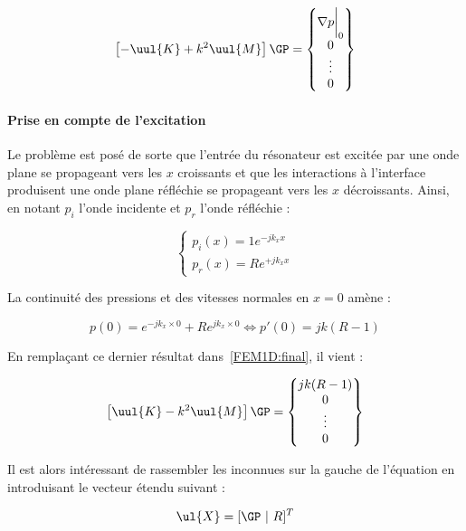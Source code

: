 \begin{equation}
	\left[- \uul{K} + k^2\uul{M}\right]\GP = \begin{Bmatrix} \nabla p\bigg|_0\\0\\\vdots\\0\end{Bmatrix}
\end{equation}

\paragraph{Prise en compte de l'excitation}

Le problème est posé de sorte que l'entrée du résonateur est excitée par une onde plane se propageant vers les $x$
croissants et que les interactions à l'interface produisent une onde plane réfléchie se propageant vers les $x$
décroissants. Ainsi, en notant $p_i$ l'onde incidente et $p_r$ l'onde réfléchie :

\begin{equation}
	\left\{
	\begin{array}{l}
		p_i(x) = 1e^{-jk_xx}\\
		p_r(x) = Re^{+jk_xx}
	\end{array}
	\right.\label{FEM1D:expr_ondes}
\end{equation}

La continuité des pressions et des vitesses normales en $x=0$ amène :

\begin{equation*}
	p(0) = e^{-jk_x\times0}+Re^{jk_x\times0} \Leftrightarrow p'(0) = jk(R-1)
\end{equation*}

En remplaçant ce dernier résultat dans~\eqref{FEM1D:final}, il vient :

\begin{equation}
\left[\uul{K} - k^2\uul{M}\right]\GP = \begin{Bmatrix} jk(R-1)  \\0\\\vdots\\0\end{Bmatrix} \label{FEM1D:final}
\end{equation}

Il est alors intéressant de rassembler les inconnues sur la gauche de l'équation en introduisant le vecteur étendu
suivant :

\begin{equation*}
	\ul{X} = [\GP ~|~ R]^T
\end{equation*}

